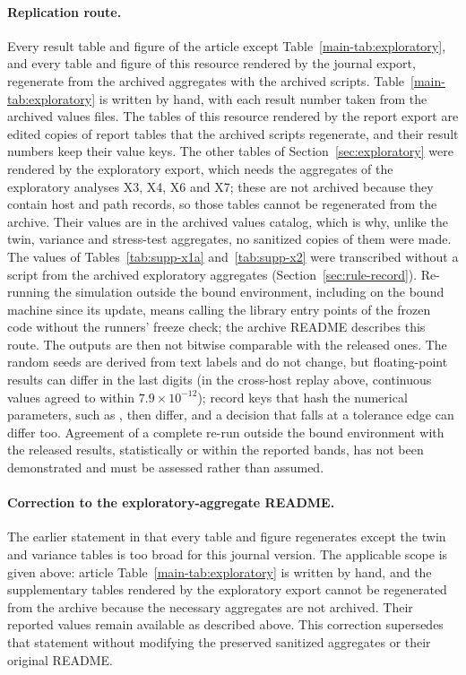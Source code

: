 \paragraph{Replication route.}
Every result table and figure of the article except Table~\ref{main-tab:exploratory}, and every table and figure of this resource rendered by the journal export, regenerate from the archived aggregates with the archived scripts. Table~\ref{main-tab:exploratory} is written by hand, with each result number taken from the archived values files. The tables of this resource rendered by the report export are edited copies of report tables that the archived scripts regenerate, and their result numbers keep their value keys. The other tables of Section~\ref{sec:exploratory} were rendered by the exploratory export, which needs the aggregates of the exploratory analyses X3, X4, X6 and X7; these are not archived because they contain host and path records, so those tables cannot be regenerated from the archive. Their values are in the archived values catalog, which is why, unlike the twin, variance and stress-test aggregates, no sanitized copies of them were made. The values of Tables~\ref{tab:supp-x1a} and~\ref{tab:supp-x2} were transcribed without a script from the archived exploratory aggregates (Section~\ref{sec:rule-record}). Re-running the simulation outside the bound environment, including on the bound machine since its update, means calling the library entry points of the frozen code without the runners' freeze check; the archive README describes this route. The outputs are then not bitwise comparable with the released ones. The random seeds are derived from text labels and do not change, but floating-point results can differ in the last digits (in the cross-host replay above, continuous values agreed to within $7.9\times10^{-12}$); record keys that hash the numerical parameters, such as , then differ, and a decision that falls at a tolerance edge can differ too. Agreement of a complete re-run outside the bound environment with the released results, statistically or within the reported bands, has not been demonstrated and must be assessed rather than assumed.

\paragraph{Correction to the exploratory-aggregate README.}
The earlier statement in  that every table and figure regenerates except the twin and variance tables is too broad for this journal version. The applicable scope is given above: article Table~\ref{main-tab:exploratory} is written by hand, and the supplementary tables rendered by the exploratory export cannot be regenerated from the archive because the necessary aggregates are not archived. Their reported values remain available as described above. This correction supersedes that statement without modifying the preserved sanitized aggregates or their original README.

